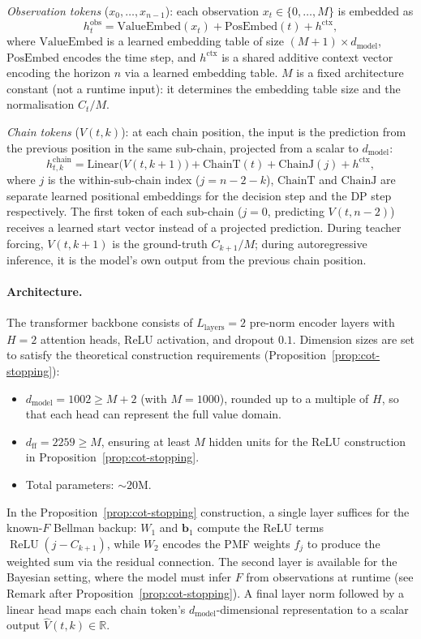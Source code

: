 \documentclass{article}
\begin{document}
\emph{Observation tokens} ($x_0, \ldots, x_{n-1}$): each observation $x_t \in \{0, \ldots, M\}$ is embedded as
\[
  h_t^{\mathrm{obs}} = \mathrm{ValueEmbed}(x_t) + \mathrm{PosEmbed}(t) + h^{\mathrm{ctx}},
\]
where $\mathrm{ValueEmbed}$ is a learned embedding table of size $(M{+}1) \times d_{\mathrm{model}}$, $\mathrm{PosEmbed}$ encodes the time step, and $h^{\mathrm{ctx}}$ is a shared additive context vector encoding the horizon $n$ via a learned embedding table. $M$ is a fixed architecture constant (not a runtime input): it determines the embedding table size and the normalisation $C_t / M$.

\emph{Chain tokens} ($V(t,k)$): at each chain position, the input is the prediction from the previous position in the same sub-chain, projected from a scalar to $d_{\mathrm{model}}$:
\[
  h^{\mathrm{chain}}_{t,k} = \mathrm{Linear}\bigl(V(t, k{+}1)\bigr) + \mathrm{ChainT}(t) + \mathrm{ChainJ}(j) + h^{\mathrm{ctx}},
\]
where $j$ is the within-sub-chain index ($j = n{-}2{-}k$), $\mathrm{ChainT}$ and $\mathrm{ChainJ}$ are separate learned positional embeddings for the decision step and the DP step respectively. The first token of each sub-chain ($j=0$, predicting $V(t, n{-}2)$) receives a learned start vector instead of a projected prediction. During teacher forcing, $V(t, k{+}1)$ is the ground-truth $C_{k+1}/M$; during autoregressive inference, it is the model's own output from the previous chain position.

\paragraph{Architecture.}
The transformer backbone consists of $L_{\mathrm{layers}} = 2$ pre-norm encoder layers with $H = 2$ attention heads, ReLU activation, and dropout $0.1$. Dimension sizes are set to satisfy the theoretical construction requirements (Proposition~\ref{prop:cot-stopping}):
\begin{itemize}
    \item $d_{\mathrm{model}} = 1002 \ge M + 2$ (with $M = 1000$), rounded up to a multiple of $H$, so that each head can represent the full value domain.
    \item $d_{\mathrm{ff}} = 2259 \ge M$, ensuring at least $M$ hidden units for the ReLU construction in Proposition~\ref{prop:cot-stopping}.
    \item Total parameters: ${\sim}20$M.
\end{itemize}
In the Proposition~\ref{prop:cot-stopping} construction, a single layer suffices for the known-$F$ Bellman backup: $W_1$ and $\mathbf{b}_1$ compute the ReLU terms $\operatorname{ReLU}(j - C_{k+1})$, while $W_2$ encodes the PMF weights $f_j$ to produce the weighted sum via the residual connection. The second layer is available for the Bayesian setting, where the model must infer $F$ from observations at runtime (see Remark after Proposition~\ref{prop:cot-stopping}). A final layer norm followed by a linear head maps each chain token's $d_{\mathrm{model}}$-dimensional representation to a scalar output $\hat{V}(t,k) \in \mathbb{R}$.
\end{document}
